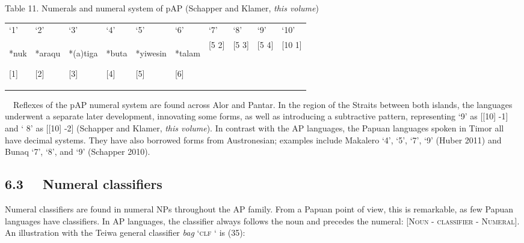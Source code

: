{\centering
Table 11. Numerals and numeral system of pAP (Schapper and Klamer, \textit{this volume})
\par}

\begin{flushleft}
\tablehead{}
\begin{supertabular}{m{0.48445985in}m{0.59415984in}m{0.6538598in}m{0.6400598in}m{0.73095983in}m{0.59415984in}m{0.43725982in}m{0.43725982in}m{0.43725982in}m{0.5184598in}}
{\textquoteleft}1{\textquoteright} &
{\textquoteleft}2{\textquoteright} &
{\textquoteleft}3{\textquoteright} &
{\textquoteleft}4{\textquoteright} &
{\textquoteleft}5{\textquoteright} &
{\textquoteleft}6{\textquoteright} &
{\textquoteleft}7{\textquoteright} &
{\textquoteleft}8{\textquoteright} &
{\textquoteleft}9{\textquoteright} &
{\textquoteleft}10{\textquoteright}\\
*nuk 

[1] &
*araqu 

[2] &
*(a)tiga 

[3] &
*buta 

[4] &
*yiwesin 

[5] &
*talam 

[6] &
[5 2] &
[5 3] &
[5 4] &
[10 1]\\
\end{supertabular}
\end{flushleft}
\ \ Reflexes of the pAP numeral system are found across Alor and Pantar.  In the region of the Straits between both islands, the languages underwent a separate later development, innovating some forms, as well as introducing a subtractive pattern, representing {\textquoteleft}9{\textquoteright} as [[10] -1] and {\textquoteleft} 8{\textquoteright} as [[10] -2] (Schapper and Klamer, \textit{this volume}). In contrast with the AP languages, the Papuan languages spoken in Timor all have decimal systems. They have also borrowed forms from Austronesian; examples include Makalero {\textquoteleft}4{\textquoteright}, {\textquoteleft}5{\textquoteright}, {\textquoteleft}7{\textquoteright}, {\textquoteleft}9{\textquoteright} (Huber 2011) and Bunaq {\textquoteleft}7{\textquoteright}, {\textquoteleft}8{\textquoteright}, and {\textquoteleft}9{\textquoteright} (Schapper 2010). 

\subsection[6.3 \ \ Numeral classifiers]{6.3 \ \ Numeral classifiers}
Numeral classifiers are found in numeral NPs throughout the AP family. From a Papuan point of view, this is remarkable, as few Papuan languages have classifiers. In AP languages, the classifier always follows the noun and precedes the numeral: \textsc{[Noun - classifier - Numeral]. A}n illustration with the Teiwa general classifier \textit{bag }{\textquoteleft}\textsc{clf} {\textquoteleft} is (35):

